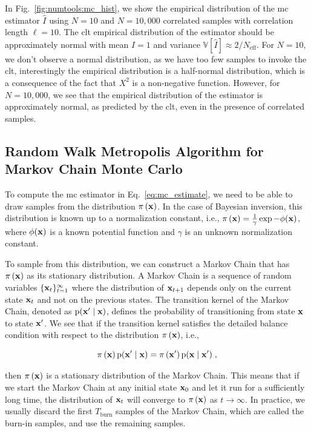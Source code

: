 In Fig.~\ref{fig:numtools:mc_hist}, we show the empirical distribution of the \gls{mc} estimator $\hat{I}$ using $N=10$ and $N=10,000$ correlated samples with correlation length $\ell = 10$. The \gls{clt} empirical distribution of the estimator should be approximately normal with mean $I = 1$ and variance $\mathbb{V}[\hat{I}] \approx 2/N_{\mathrm{eff}}$. For $N=10$, we don't observe a normal distribution, as we have too few samples to invoke the \gls{clt}, interestingly the empirical distribution is a half-normal distribution, which is a consequence of the fact that $X^2$ is a non-negative function. However, for $N=10,000$, we see that the empirical distribution of the estimator is approximately normal, as predicted by the \gls{clt}, even in the presence of correlated samples.

\subsection{Random Walk Metropolis Algorithm for Markov Chain Monte Carlo}
\label{sec:ntools:mcmc:mcmc}

To compute the \gls{mc} estimator in Eq.~\eqref{eq:mc_estimate}, we need to be able to draw samples from the distribution $\pi \left( \mathbf{x}\right)$. In the case of Bayesian inversion, this distribution is known up to a normalization constant, i.e., $\pi \left( \mathbf{x}\right) = \frac{1}{\gamma} \exp{-\phi(\mathbf{x})}$, where $\phi(\mathbf{x})$ is a known potential function and $\gamma$ is an unknown normalization constant. 

\smallskip
To sample from this distribution, we can construct a Markov Chain that has $\pi \left( \mathbf{x}\right)$ as its stationary distribution. A Markov Chain is a sequence of random variables $\{\mathbf{x}_t\}_{t=1}^\infty$ where the distribution of $\mathbf{x}_{t+1}$ depends only on the current state $\mathbf{x}_t$ and not on the previous states. The transition kernel of the Markov Chain, denoted as $\mathrm{p}(\mathbf{x}' \mid \mathbf{x})$, defines the probability of transitioning from state $\mathbf{x}$ to state $\mathbf{x}'$. We see that if the transition kernel satisfies the detailed balance condition with respect to the distribution $\pi \left( \mathbf{x}\right)$, i.e.,

\begin{equation}
  \pi \left( \mathbf{x}\right) \mathrm{p}(\mathbf{x}' \mid \mathbf{x}) = \pi \left( \mathbf{x}'\right) \mathrm{p}(\mathbf{x} \mid \mathbf{x}')\;,
\end{equation}

then $\pi \left( \mathbf{x}\right)$ is a stationary distribution of the Markov Chain. This means that if we start the Markov Chain at any initial state $\mathbf{x}_0$ and let it run for a sufficiently long time, the distribution of $\mathbf{x}_t$ will converge to $\pi \left( \mathbf{x}\right)$ as $t \to \infty$. In practice, we usually discard the first $T_{\mathrm{burn}}$ samples of the Markov Chain, which are called the burn-in samples, and use the remaining samples.

